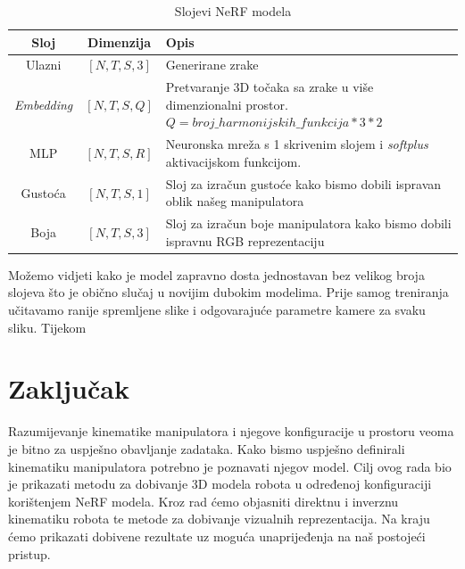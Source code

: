 \documentclass[times, utf8, diplomskirad]{fer}
\begin{document}
\newpage
\begin{table}[H]
    \centering
\caption{Slojevi NeRF modela}
\label{tab:nerf}
\begin{tabular}{|c|c|p{10cm}|}
  \hline
  Sloj & Dimenzija & Opis \\
  \hline
  Ulazni & $[N, T, S, 3]$ & Generirane zrake \\
  \hline
  \textit{Embedding} & $[N, T, S, Q]$ & Pretvaranje 3D točaka sa zrake u više dimenzionalni prostor.
  $Q = broj\_harmonijskih\_funkcija * 3 * 2$ \\
  \hline
  MLP & $[N, T, S, R]$ & Neuronska mreža s 1 skrivenim slojem i \textit{softplus} aktivacijskom funkcijom. \\
  \hline
  Gustoća & $[N, T, S, 1]$ & Sloj za izračun gustoće kako bismo dobili ispravan oblik našeg manipulatora \\
  \hline
  Boja & $[N, T, S, 3]$ & Sloj za izračun boje manipulatora kako bismo dobili ispravnu RGB reprezentaciju \\
  \hline
\end{tabular}
\end{table}

Možemo vidjeti kako je model zapravno dosta jednostavan bez velikog broja slojeva što je obično slučaj u novijim dubokim modelima.
Prije samog treniranja učitavamo ranije spremljene slike i odgovarajuće parametre kamere za svaku sliku.
Tijekom
\chapter{Zaključak}
\label{pog:zakljucak}









\begin{sazetak}
    Razumijevanje kinematike manipulatora i njegove konfiguracije u prostoru veoma je bitno za uspješno obavljanje zadataka.
    Kako bismo uspješno definirali kinematiku manipulatora potrebno je poznavati njegov model.
    Cilj ovog rada bio je prikazati metodu za dobivanje 3D modela robota u određenoj konfiguraciji korištenjem NeRF modela.
    Kroz rad ćemo objasniti direktnu i inverznu kinematiku robota te metode za dobivanje vizualnih reprezentacija.
    Na kraju ćemo prikazati dobivene rezultate uz moguća unaprijeđenja na naš postojeći pristup.
\end{sazetak}
\end{document}
